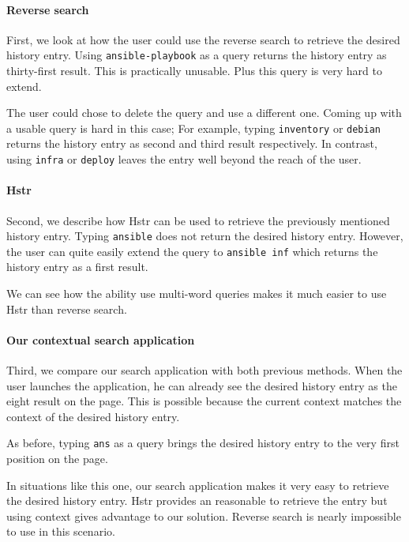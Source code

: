 
\paragraph{Reverse search} 
First, we look at how the user could use the reverse search to retrieve the desired history entry.
Using \verb|ansible-playbook| as a query returns the history entry as thirty-first result. This is practically unusable. Plus this query is very hard to extend.

The user could chose to delete the query and use a different one. Coming up with a usable query is hard in this case; For example, typing \verb|inventory| or \verb|debian| returns the history entry as second and third result respectively. In contrast, using \verb|infra| or \verb|deploy| leaves the entry well beyond the reach of the user. 

\paragraph{Hstr}
Second, we describe how Hstr can be used to retrieve the previously mentioned history entry.
Typing \verb|ansible| does not return the desired history entry. However, the user can quite easily extend the query to \verb|ansible inf| which returns the history entry as a first result. 

We can see how the ability use multi-word queries makes it much easier to use Hstr than reverse search.

\paragraph{Our contextual search application}

Third, we compare our search application with both previous methods. 
When the user launches the application, he can already see the desired history entry as the eight result on the page. This is possible because the current context matches the context of the desired history entry. 

As before, typing \verb|ans| as a query brings the desired history entry to the very first position on the page. 

In situations like this one, our search application makes it very easy to retrieve the desired history entry. Hstr provides an reasonable to retrieve the entry but using context gives advantage to our solution. Reverse search is nearly impossible to use in this scenario.


